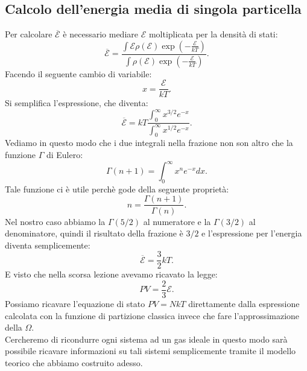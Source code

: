\subsection{Calcolo dell'energia media di singola particella}%
Per calcolare $\overline{\mathcal{E}}$ è necessario mediare $\mathcal{E}$ moltiplicata per la densità di stati:
\[
\overline{\mathcal{E}} = \frac
			{\int \mathcal{E}\rho\left( \mathcal{E} \right) \exp\left( -\frac{\mathcal{E}}{kT} \right) }
			{\int\rho\left( \mathcal{E} \right) \exp\left( -\frac{\mathcal{E}}{kT} \right)}
.\] 
Facendo il seguente cambio di variabile:
\[
 x = \frac{\mathcal{E}}{kT}
 .\] 
 Si semplifica l'espressione, che diventa:
\[
	\overline{\mathcal{E}} = kT \frac
	{\int_{0}^{\infty}x^{3 /2} e^{-x}}
	{\int _{0}^{\infty}x^{1 /2}e^{-x}}
.\] 
Vediamo in questo modo che i due integrali nella frazione non son altro che la funzione $\Gamma$ di Eulero:
\[
	\Gamma\left( n+1 \right) = \int_{0}^{\infty}x^{n}e^{-x}dx
.\] 
Tale funzione ci è utile perchè gode della seguente proprietà:
\[
	n = \frac{\Gamma\left( n+1 \right) }{\Gamma\left( n \right) }
.\] 
Nel nostro caso abbiamo la $\Gamma\left( 5 /2 \right)$ al numeratore e la $\Gamma \left( 3 / 2 \right)$ al denominatore, quindi il risultato della frazione è $3 / 2$ e l'espressione per l'energia diventa semplicemente: 
\[
	\overline{\mathcal{E}} =\frac{3}{2}kT
.\] 
E visto che nella scorsa lezione avevamo ricavato la legge:
\[
	PV = \frac{2}{3}\mathcal{E}
.\] 
Possiamo ricavare l'equazione di stato $PV = NkT$ direttamente dalla espressione calcolata con la funzione di partizione classica invece che fare l'approssimazione della $\Omega$.\\
Cercheremo di ricondurre ogni sistema ad un gas ideale in questo modo sarà possibile ricavare informazioni su tali sistemi semplicemente tramite il modello teorico che abbiamo costruito adesso.
